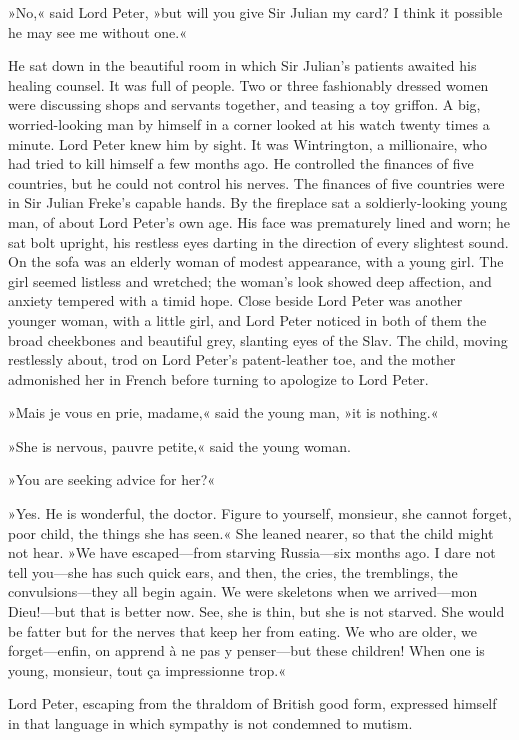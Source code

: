 »No,« said Lord Peter, »but will you give Sir Julian my card? I think it possible he may see me without one.«

He sat down in the beautiful room in which Sir Julian's patients awaited his healing counsel. It was full of people. Two or three fashionably dressed women were discussing shops and servants together, and teasing a toy griffon. A big, worried-looking man by himself in a corner looked at his watch twenty times a minute. Lord Peter knew him by sight. It was Wintrington, a millionaire, who had tried to kill himself a few months ago. He controlled the finances of five countries, but he could not control his nerves. The finances of five countries were in Sir Julian Freke's capable hands. By the fireplace sat a soldierly-looking young man, of about Lord Peter's own age. His face was prematurely lined and worn; he sat bolt upright, his restless eyes darting in the direction of every slightest sound. On the sofa was an elderly woman of modest appearance, with a young girl. The girl seemed listless and wretched; the woman's look showed deep affection, and anxiety tempered with a timid hope. Close beside Lord Peter was another younger woman, with a little girl, and Lord Peter noticed in both of them the broad cheekbones and beautiful grey, slanting eyes of the Slav. The child, moving restlessly about, trod on Lord Peter's patent-leather toe, and the mother admonished her in French before turning to apologize to Lord Peter.

»Mais je vous en prie, madame,« said the young man, »it is nothing.«

»She is nervous, pauvre petite,« said the young woman.

»You are seeking advice for her?«

»Yes. He is wonderful, the doctor. Figure to yourself, monsieur, she cannot forget, poor child, the things she has seen.« She leaned nearer, so that the child might not hear. »We have escaped—from starving Russia—six months ago. I dare not tell you—she has such quick ears, and then, the cries, the tremblings, the convulsions—they all begin again. We were skeletons when we arrived—mon Dieu!---but that is better now. See, she is thin, but she is not starved. She would be fatter but for the nerves that keep her from eating. We who are older, we forget—enfin, on apprend à ne pas y penser—but these children! When one is young, monsieur, tout ça impressionne trop.«

Lord Peter, escaping from the thraldom of British good form, expressed himself in that language in which sympathy is not condemned to mutism.

